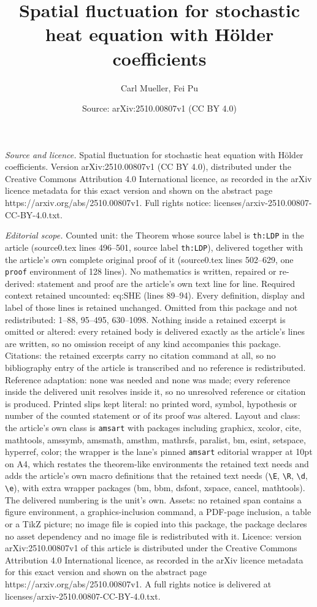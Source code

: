 \documentclass[10pt,a4paper]{amsart}
\title[Spatial fluctuation for stochastic heat equation with H\"old]{Spatial fluctuation for stochastic heat equation with H\"older coefficients}
\author{Carl Mueller, Fei Pu}
\date{Source: arXiv:2510.00807v1 (CC BY 4.0)}
\begin{document}
\maketitle

\noindent\emph{Source and licence.} Spatial fluctuation for stochastic heat equation with H\"older coefficients. Version arXiv:2510.00807v1 (CC BY 4.0), distributed under the Creative Commons Attribution 4.0 International licence, as recorded in the arXiv licence metadata for this exact version and shown on the abstract page https://arxiv.org/abs/2510.00807v1. Full rights notice: licenses/arxiv-2510.00807-CC-BY-4.0.txt.\par\smallskip

\noindent\textit{Editorial scope.} Counted unit: the Theorem whose source label is \texttt{th:LDP} in the article (source0.tex lines 496--501, source label \texttt{th:LDP}), delivered together with the article's own complete original proof of it (source0.tex lines 502--629, one \texttt{proof} environment of 128 lines). No mathematics is written, repaired or re-derived: statement and proof are the article's own text line for line. Required context retained uncounted: eq:SHE (lines 89--94). Every definition, display and label of those lines is retained unchanged. Omitted from this package and not redistributed: 1--88, 95--495, 630--1098. Nothing inside a retained excerpt is omitted or altered: every retained body is delivered exactly as the article's lines are written, so no omission receipt of any kind accompanies this package. Citations: the retained excerpts carry no citation command at all, so no bibliography entry of the article is transcribed and no reference is redistributed. Reference adaptation: none was needed and none was made; every reference inside the delivered unit resolves inside it, so no unresolved reference or citation is produced. Printed slips kept literal: no printed word, symbol, hypothesis or number of the counted statement or of its proof was altered. Layout and class: the article's own class is \texttt{amsart} with packages including graphicx, xcolor, cite, mathtools, amssymb, amsmath, amsthm, mathrsfs, paralist, bm, esint, setspace, hyperref, color; the wrapper is the lane's pinned \texttt{amsart} editorial wrapper at 10pt on A4, which restates the theorem-like environments the retained text needs and adds the article's own macro definitions that the retained text needs (\texttt{\textbackslash E}, \texttt{\textbackslash R}, \texttt{\textbackslash d}, \texttt{\textbackslash e}), with extra wrapper packages (bm, bbm, dsfont, xspace, cancel, mathtools). The delivered numbering is the unit's own. Assets: no retained span contains a figure environment, a graphics-inclusion command, a PDF-page inclusion, a table or a TikZ picture; no image file is copied into this package, the package declares no asset dependency and no image file is redistributed with it. Licence: version arXiv:2510.00807v1 of this article is distributed under the Creative Commons Attribution 4.0 International licence, as recorded in the arXiv licence metadata for this exact version and shown on the abstract page https://arxiv.org/abs/2510.00807v1. A full rights notice is delivered at licenses/arxiv-2510.00807-CC-BY-4.0.txt. 
\end{document}
